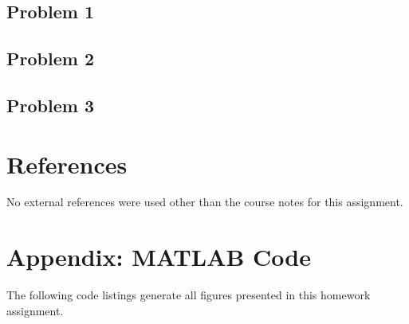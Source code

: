 \documentclass[11pt]{article}
\begin{document}
\subsection{Problem 1}

\subsection{Problem 2}

\subsection{Problem 3}

\section{References} %

No external references were used other than the course notes for this assignment.

\section*{Appendix: MATLAB Code} %

The following code listings generate all figures presented in this homework assignment.


\end{document}
